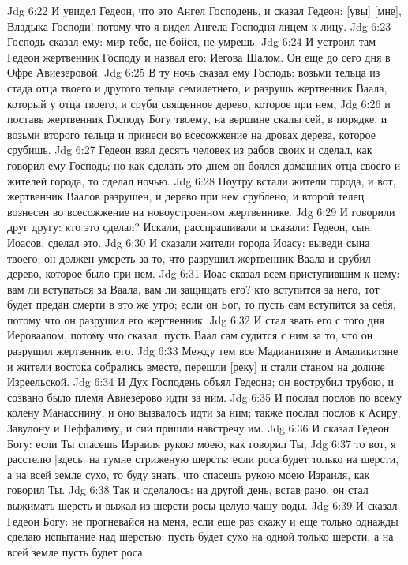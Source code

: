 Jdg 6:22  И увидел Гедеон, что это Ангел Господень, и сказал Гедеон: [увы] [мне], Владыка Господи! потому что я видел Ангела Господня лицем к лицу.
Jdg 6:23  Господь сказал ему: мир тебе, не бойся, не умрешь.
Jdg 6:24  И устроил там Гедеон жертвенник Господу и назвал его: Иегова Шалом. Он еще до сего дня в Офре Авиезеровой.
Jdg 6:25  В ту ночь сказал ему Господь: возьми тельца из стада отца твоего и другого тельца семилетнего, и разрушь жертвенник Ваала, который у отца твоего, и сруби священное дерево, которое при нем,
Jdg 6:26  и поставь жертвенник Господу Богу твоему, на вершине скалы сей, в порядке, и возьми второго тельца и принеси во всесожжение на дровах дерева, которое срубишь.
Jdg 6:27  Гедеон взял десять человек из рабов своих и сделал, как говорил ему Господь; но как сделать это днем он боялся домашних отца своего и жителей города, то сделал ночью.
Jdg 6:28  Поутру встали жители города, и вот, жертвенник Ваалов разрушен, и дерево при нем срублено, и второй телец вознесен во всесожжение на новоустроенном жертвеннике.
Jdg 6:29  И говорили друг другу: кто это сделал? Искали, расспрашивали и сказали: Гедеон, сын Иоасов, сделал это.
Jdg 6:30  И сказали жители города Иоасу: выведи сына твоего; он должен умереть за то, что разрушил жертвенник Ваала и срубил дерево, которое было при нем.
Jdg 6:31  Иоас сказал всем приступившим к нему: вам ли вступаться за Ваала, вам ли защищать его? кто вступится за него, тот будет предан смерти в это же утро; если он Бог, то пусть сам вступится за себя, потому что он разрушил его жертвенник.
Jdg 6:32  И стал звать его с того дня Иероваалом, потому что сказал: пусть Ваал сам судится с ним за то, что он разрушил жертвенник его.
Jdg 6:33  Между тем все Мадианитяне и Амаликитяне и жители востока собрались вместе, перешли [реку] и стали станом на долине Изреельской.
Jdg 6:34  И Дух Господень объял Гедеона; он вострубил трубою, и созвано было племя Авиезерово идти за ним.
Jdg 6:35  И послал послов по всему колену Манассиину, и оно вызвалось идти за ним; также послал послов к Асиру, Завулону и Неффалиму, и сии пришли навстречу им.
Jdg 6:36  И сказал Гедеон Богу: если Ты спасешь Израиля рукою моею, как говорил Ты,
Jdg 6:37  то вот, я расстелю [здесь] на гумне стриженую шерсть: если роса будет только на шерсти, а на всей земле сухо, то буду знать, что спасешь рукою моею Израиля, как говорил Ты.
Jdg 6:38  Так и сделалось: на другой день, встав рано, он стал выжимать шерсть и выжал из шерсти росы целую чашу воды.
Jdg 6:39  И сказал Гедеон Богу: не прогневайся на меня, если еще раз скажу и еще только однажды сделаю испытание над шерстью: пусть будет сухо на одной только шерсти, а на всей земле пусть будет роса.
